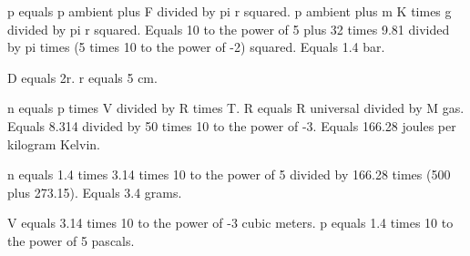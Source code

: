 p equals p ambient plus F divided by pi r squared.  
p ambient plus m K times g divided by pi r squared.  
Equals 10 to the power of 5 plus 32 times 9.81 divided by pi times (5 times 10 to the power of -2) squared.  
Equals 1.4 bar.  

D equals 2r.  
r equals 5 cm.  

n equals p times V divided by R times T.  
R equals R universal divided by M gas.  
Equals 8.314 divided by 50 times 10 to the power of -3.  
Equals 166.28 joules per kilogram Kelvin.  

n equals 1.4 times 3.14 times 10 to the power of 5 divided by 166.28 times (500 plus 273.15).  
Equals 3.4 grams.  

V equals 3.14 times 10 to the power of -3 cubic meters.  
p equals 1.4 times 10 to the power of 5 pascals.